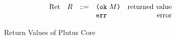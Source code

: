 \documentclass[../main.tex]{subfiles}
\begin{document}
\begin{figure}[t]
    \centering
    \[\begin{array}{lrclr}
        \textrm{Ret} & R & ::= & \texttt{(} \texttt{ok} ~ M \texttt{)}     & \textrm{returned value}\\
                     &   &     & \texttt{err}{}     & \textrm{error}
    \end{array}\]
    \caption{Return Values of Plutus Core}
    \label{fig:Plutus_core_return_values}
\end{figure}
\end{document}
